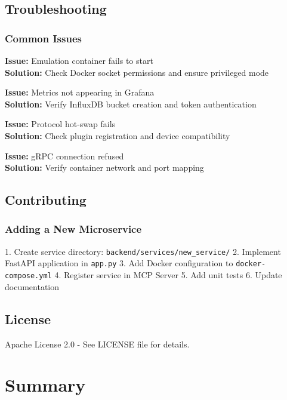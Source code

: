 \documentclass[10pt,a4paper]{article}
\begin{document}
\subsection{Troubleshooting}

\subsubsection{Common Issues}

\textbf{Issue:} Emulation container fails to start \\
\textbf{Solution:} Check Docker socket permissions and ensure privileged mode

\textbf{Issue:} Metrics not appearing in Grafana \\
\textbf{Solution:} Verify InfluxDB bucket creation and token authentication

\textbf{Issue:} Protocol hot-swap fails \\
\textbf{Solution:} Check plugin registration and device compatibility

\textbf{Issue:} gRPC connection refused \\
\textbf{Solution:} Verify container network and port mapping

\subsection{Contributing}

\subsubsection{Adding a New Microservice}

1. Create service directory: \texttt{backend/services/new\_service/}
2. Implement FastAPI application in \texttt{app.py}
3. Add Docker configuration to \texttt{docker-compose.yml}
4. Register service in MCP Server
5. Add unit tests
6. Update documentation

\subsection{License}

Apache License 2.0 - See LICENSE file for details.

\section{Summary}
\end{document}

